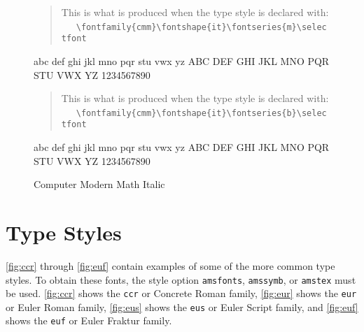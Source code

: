 \begin{figure}
\begin{singlespace}
\begin{verse}
This is what is produced when the type style is declared with:\\
\ \ \ \verb+\fontfamily{cmm}\fontshape{it}\fontseries{m}\selectfont+\\
\end{verse}
{\selectfont
abc def ghi jkl mno pqr stu vwx yz ABC DEF GHI JKL MNO PQR STU
VWX YZ 1234567890\par}
\vspace{1em}
\begin{verse}
This is what is produced when the type style is declared with:\\
\ \ \ \verb+\fontfamily{cmm}\fontshape{it}\fontseries{b}\selectfont+\\
\end{verse}
{\selectfont
abc def ghi jkl mno pqr stu vwx yz ABC DEF GHI JKL MNO PQR STU
VWX YZ 1234567890\par}
\vspace{1em}
\caption{Computer Modern Math Italic}
\label{fig:cmm}
\end{singlespace}
\end{figure}
 
\chapter{\amslatex{} Type Styles}
\ref{fig:ccr} through \ref{fig:euf} contain examples of some of the
more common \amslatex{} type styles.  To obtain these fonts, the
style option {\tt amsfonts}, {\tt amssymb}, or {\tt amstex} must be
used.
\ref{fig:ccr} shows the {\tt ccr} or Concrete Roman family,
\ref{fig:eur} shows the {\tt eur} or Euler Roman family,
\ref{fig:eus} shows the {\tt eus} or Euler Script family, and
\ref{fig:euf} shows the {\tt euf} or Euler Fraktur family.
 
